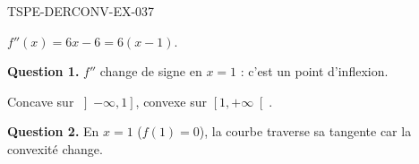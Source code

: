 \begin{corrige}{TSPE-DERCONV-EX-037}

$f''(x) = 6x - 6 = 6(x-1)$.


\textbf{Question 1.} $f''$ change de signe en $x = 1$ : c'est un point d'inflexion.

Concave sur $\left]-\infty, 1\right]$, convexe sur $\left[1, +\infty\right[$.

\textbf{Question 2.} En $x = 1$ ($f(1) = 0$), la courbe traverse sa tangente car la convexité change.

\end{corrige}
